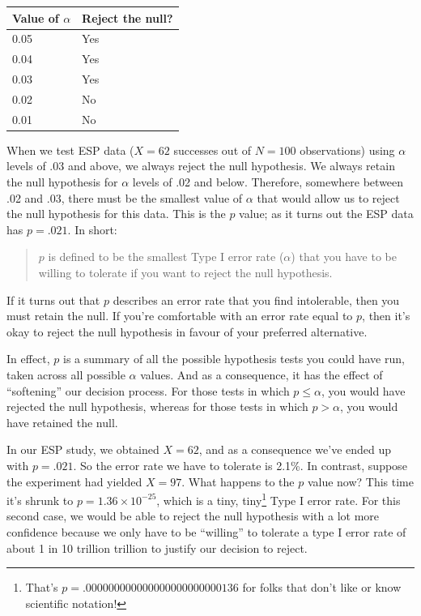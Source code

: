 \documentclass[
]{book}
\theoremstyle{definition}
\theoremstyle{definition}
\theoremstyle{definition}
\theoremstyle{definition}
\theoremstyle{remark}
\begin{document}
\begin{longtable}[]{@{}ll@{}}
\toprule()
Value of \(\alpha\) & Reject the null? \\
\midrule()
\endhead
0.05 & Yes \\
0.04 & Yes \\
0.03 & Yes \\
0.02 & No \\
0.01 & No \\
\bottomrule()
\end{longtable}

When we test ESP data (\(X=62\) successes out of \(N=100\) observations) using \(\alpha\) levels of .03 and above, we always reject the null hypothesis. We always retain the null hypothesis for \(\alpha\) levels of .02 and below. Therefore, somewhere between .02 and .03, there must be the smallest value of \(\alpha\) that would allow us to reject the null hypothesis for this data. This is the \(p\) value; as it turns out the ESP data has \(p = .021\). In short:

\begin{quote}
\(p\) is defined to be the smallest Type I error rate (\(\alpha\)) that you have to be willing to tolerate if you want to reject the null hypothesis.
\end{quote}

If it turns out that \(p\) describes an error rate that you find intolerable, then you must retain the null. If you're comfortable with an error rate equal to \(p\), then it's okay to reject the null hypothesis in favour of your preferred alternative.

In effect, \(p\) is a summary of all the possible hypothesis tests you could have run, taken across all possible \(\alpha\) values. And as a consequence, it has the effect of ``softening'' our decision process. For those tests in which \(p \leq \alpha\), you would have rejected the null hypothesis, whereas for those tests in which \(p > \alpha\), you would have retained the null.

In our ESP study, we obtained \(X=62\), and as a consequence we've ended up with \(p = .021\). So the error rate we have to tolerate is 2.1\%. In contrast, suppose the experiment had yielded \(X=97\). What happens to the \(p\) value now? This time it's shrunk to \(p = 1.36 \times 10^{-25}\), which is a tiny, tiny\footnote{That's \(p = .000000000000000000000000136\) for folks that don't like or know scientific notation!} Type I error rate. For this second case, we would be able to reject the null hypothesis with a lot more confidence because we only have to be ``willing'' to tolerate a type I error rate of about 1 in 10 trillion trillion to justify our decision to reject.
\end{document}
